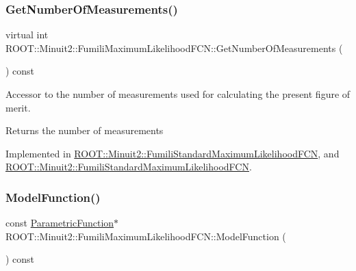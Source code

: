 \subsubsection{\texorpdfstring{GetNumberOfMeasurements()}{GetNumberOfMeasurements()}\hspace{0.1cm}{\footnotesize\ttfamily [2/2]}}
{\footnotesize\ttfamily virtual int R\+O\+O\+T\+::\+Minuit2\+::\+Fumili\+Maximum\+Likelihood\+F\+C\+N\+::\+Get\+Number\+Of\+Measurements (\begin{DoxyParamCaption}{ }\end{DoxyParamCaption}) const\hspace{0.3cm}{\ttfamily [pure virtual]}}

Accessor to the number of measurements used for calculating the present figure of merit.

\begin{DoxyReturn}{Returns}
the number of measurements 
\end{DoxyReturn}


Implemented in \mbox{\hyperlink{classROOT_1_1Minuit2_1_1FumiliStandardMaximumLikelihoodFCN_a09175207d6c0ed94898f3985b4d376d2}{R\+O\+O\+T\+::\+Minuit2\+::\+Fumili\+Standard\+Maximum\+Likelihood\+F\+CN}}, and \mbox{\hyperlink{classROOT_1_1Minuit2_1_1FumiliStandardMaximumLikelihoodFCN_a7c1f879db750fb33c206d3edbbd19ae0}{R\+O\+O\+T\+::\+Minuit2\+::\+Fumili\+Standard\+Maximum\+Likelihood\+F\+CN}}.

\mbox{\label{classROOT_1_1Minuit2_1_1FumiliMaximumLikelihoodFCN_ae1ea41126186d9dd5c83fdcec08cff70}} 
\subsubsection{\texorpdfstring{ModelFunction()}{ModelFunction()}\hspace{0.1cm}{\footnotesize\ttfamily [1/2]}}
{\footnotesize\ttfamily const \mbox{\hyperlink{classROOT_1_1Minuit2_1_1ParametricFunction}{Parametric\+Function}}$\ast$ R\+O\+O\+T\+::\+Minuit2\+::\+Fumili\+Maximum\+Likelihood\+F\+C\+N\+::\+Model\+Function (\begin{DoxyParamCaption}{ }\end{DoxyParamCaption}) const\hspace{0.3cm}{\ttfamily [inline]}}

